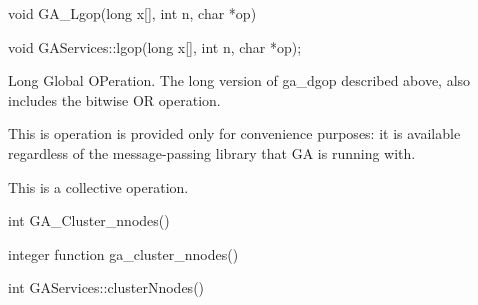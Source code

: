 \documentclass[12pt]{article}
\begin{document}

\begin{capi}
\begin{ccode}
void GA_Lgop(long x[], int n, char *op)
\end{ccode}
\begin{funcargs}
\end{funcargs}
\end{capi}

\begin{cxxapi}
\begin{cxxcode}
void GAServices::lgop(long x[], int n, char *op);
\end{cxxcode}
\begin{funcargs}
\end{funcargs}
\end{cxxapi}

\begin{desc}

Long Global OPeration. The long version of ga_dgop described above, 
also includes the bitwise OR operation.

This is operation is provided only for convenience purposes: it is 
available regardless of the message-passing library that GA is running with.

This is a collective operation.
\end{desc}


\begin{capi}
\begin{ccode}
int GA_Cluster_nnodes()
\end{ccode}
\end{capi}

\begin{fapi}
\begin{fcode}
integer function ga_cluster_nnodes()
\end{fcode}
\end{fapi}

\begin{cxxapi}
\begin{cxxcode}
int GAServices::clusterNnodes()
\end{cxxcode}
\end{cxxapi}
\end{document}

